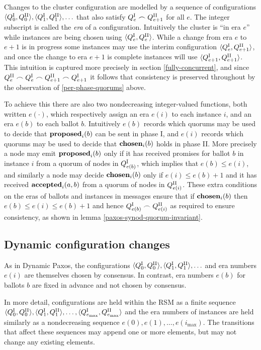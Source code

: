 \documentclass[journal]{IEEEtran}
\begin{document}
Changes to the cluster configuration are modelled by a sequence of
configurations $ \langle {Q}^\textrm{I}_{0}, {Q}^\textrm{II}_{0} \rangle, \langle {Q}^\textrm{I}_{1}, {Q}^\textrm{II}_{1}
\rangle, \ldots$ that also satisfy ${Q}^\textrm{I}_{e} \frown {Q}^\textrm{II}_{e+1}$ for all $e$.  The
integer subscript is called the \textit{era} of a configuration.  Intuitively
the cluster is ``in era $e$'' while instances are being chosen using $\langle
{Q}^\textrm{I}_{e}, {Q}^\textrm{II}_{e}\rangle$. While a change from era $e$ to $e+1$ is in progress
some instances may use the interim configuration $\langle {Q}^\textrm{I}_{e}, {Q}^\textrm{II}_{e+1}
\rangle$, and once the change to era $e+1$ is complete instances will use
$\langle {Q}^\textrm{I}_{e+1}, {Q}^\textrm{II}_{e+1} \rangle$. This intuition is captured more
precisely in section \ref{fully-concurrent}, and since ${Q}^\textrm{II}_{e} \frown {Q}^\textrm{I}_{e}
\frown {Q}^\textrm{II}_{e+1} \frown {Q}^\textrm{I}_{e+1}$ it follows that consistency is preserved
throughout by the observation of \ref{per-phase-quorums} above.

To achieve this there are also two nondecreasing integer-valued functions, both
written $e(\cdot)$, which respectively assign an era $e(i)$ to each instance
$i$, and an era $e(b)$ to each ballot $b$. Intuitively $e(b)$ records which
quorums may be used to decide that $\mathbf{proposed}_{i}(b)$ can be sent in phase I, and
$e(i)$ records which quorums may be used to decide that $\mathbf{chosen}_{i}(b)$ holds
in phase II. More precisely a node may emit $\mathbf{proposed}_{i}(b)$ only if it has
received promises for ballot $b$ in instance $i$ from a quorum of nodes in
${Q}^\textrm{I}_{e(b)}$, which implies that $e(b) \le e(i)$, and similarly a node may decide
$\mathbf{chosen}_{i}(b)$ only if ${e(i) \le e(b)+1}$ and it has received $\mathbf{accepted}_{i}(a,b)$
from a quorum of nodes in ${Q}^\textrm{II}_{e(i)}$. These extra conditions on the eras of
ballots and instances in messages ensure that if $\mathbf{chosen}_{i}(b)$ then ${e(b)
\le e(i) \le e(b)+1}$ and hence ${Q}^\textrm{I}_{e(b)} \frown {Q}^\textrm{II}_{e(i)}$ as required to
ensure consistency, as shown in lemma \ref{paxos-synod-quorum-invariant}.

\subsection{Dynamic configuration changes}

As in Dynamic Paxos, the configurations $\langle {Q}^\textrm{I}_{0}, {Q}^\textrm{II}_{0} \rangle,
\langle {Q}^\textrm{I}_{1}, {Q}^\textrm{II}_{1} \rangle, \ldots$ and era numbers $e(i)$ are themselves
chosen by consensus. In contrast, era numbers $e(b)$ for ballots $b$ are fixed
in advance and not chosen by consensus.

In more detail, configurations are held within the RSM as a finite sequence
$\langle {Q}^\textrm{I}_{0}, {Q}^\textrm{II}_{0} \rangle, \langle {Q}^\textrm{I}_{1}, {Q}^\textrm{II}_{1} \rangle, \ldots,
\langle {Q}^\textrm{I}_{e_\mathrm{max}}, {Q}^\textrm{II}_{e_\mathrm{max}} \rangle$ and the era numbers
of instances are held similarly as a nondecreasing sequence $e(0), e(1),
\ldots, e(i_\mathrm{max})$.  The transitions that affect these sequences may
append one or more elements, but may not change any existing elements.
\end{document}
